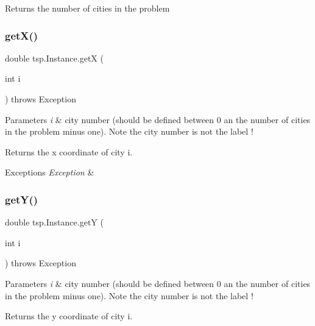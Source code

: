\begin{DoxyReturn}{Returns}
the number of cities in the problem 
\end{DoxyReturn}
\mbox{\label{classtsp_1_1_instance_aaf681fa6bd2c5cca6a7b8ec8baf36800}} 
\subsubsection{\texorpdfstring{get\+X()}{getX()}}
{\footnotesize\ttfamily double tsp.\+Instance.\+getX (\begin{DoxyParamCaption}\item[{int}]{i }\end{DoxyParamCaption}) throws Exception\hspace{0.3cm}{\ttfamily [inline]}}


\begin{DoxyParams}{Parameters}
{\em i} & city number (should be defined between 0 an the number of cities in the problem minus one). Note the city number is not the label ! \\
\hline
\end{DoxyParams}
\begin{DoxyReturn}{Returns}
the x coordinate of city i. 
\end{DoxyReturn}

\begin{DoxyExceptions}{Exceptions}
{\em Exception} & \\
\hline
\end{DoxyExceptions}
\mbox{\label{classtsp_1_1_instance_aebda0a2b0ded89e41e077f61840e6086}} 
\subsubsection{\texorpdfstring{get\+Y()}{getY()}}
{\footnotesize\ttfamily double tsp.\+Instance.\+getY (\begin{DoxyParamCaption}\item[{int}]{i }\end{DoxyParamCaption}) throws Exception\hspace{0.3cm}{\ttfamily [inline]}}


\begin{DoxyParams}{Parameters}
{\em i} & city number (should be defined between 0 an the number of cities in the problem minus one). Note the city number is not the label ! \\
\hline
\end{DoxyParams}
\begin{DoxyReturn}{Returns}
the y coordinate of city i. 
\end{DoxyReturn}


